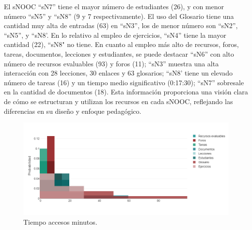 El sNOOC ``sN7'' tiene el mayor número de estudiantes (26), y con menor
número ``sN5'' y ``sN8'' (9 y 7 respectivamente). El uso del Glosario tiene
una cantidad muy alta de entradas (63) en ``sN3'', los de menor número son
``sN2'', ``sN5'', y ``sN8'. En lo relativo al empleo de ejercicios, ``sN4''
tiene la mayor cantidad (22), ``sN8" no tiene. En cuanto al empleo más
alto de recursos, foros, tareas, documentos, lecciones y estudiantes, se
puede destacar ``sN6'' con alto número de recursos evaluables (93) y foros
(11); ``sN3'' muestra una alta interacción con 28 lecciones, 30 enlaces y
63 glosarios; ``sN8' tiene un elevado número de tareas (16) y un tiempo
medio significativo (0:17:30); ``sN7'' sobresale en la cantidad de
documentos (18). Esta información proporciona una visión clara de cómo
se estructuran y utilizan los recursos en cada sNOOC, reflejando las
diferencias en su diseño y enfoque pedagógico.
	
\begin{figure}[htbp]
\centering
\begin{minipage}{.85\textwidth}
\caption{Tiempo accesos minutos.}
\label{fig-11}
\includegraphics[width=\textwidth]{Imagem11.png}
\end{minipage}
\end{figure}
		
